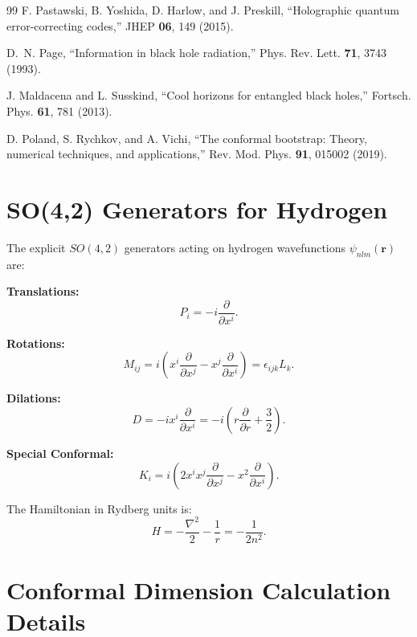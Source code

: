 \documentclass[aps,prd,twocolumn,superscriptaddress,floatfix]{revtex4-2}
\begin{document}
\begin{thebibliography}{99}
F. Pastawski, B. Yoshida, D. Harlow, and J. Preskill,
``Holographic quantum error-correcting codes,''
JHEP \textbf{06}, 149 (2015).

D.~N. Page,
``Information in black hole radiation,''
Phys. Rev. Lett. \textbf{71}, 3743 (1993).

J. Maldacena and L. Susskind,
``Cool horizons for entangled black holes,''
Fortsch. Phys. \textbf{61}, 781 (2013).

D. Poland, S. Rychkov, and A. Vichi,
``The conformal bootstrap: Theory, numerical techniques, and applications,''
Rev. Mod. Phys. \textbf{91}, 015002 (2019).

\end{thebibliography}


\appendix

\section{SO(4,2) Generators for Hydrogen}

The explicit $SO(4,2)$ generators acting on hydrogen wavefunctions $\psi_{nlm}(\mathbf{r})$ are:

\textbf{Translations:}
\begin{equation}
P_i = -i\frac{\partial}{\partial x^i}.
\end{equation}

\textbf{Rotations:}
\begin{equation}
M_{ij} = i\left(x^i \frac{\partial}{\partial x^j} - x^j \frac{\partial}{\partial x^i}\right) = \epsilon_{ijk} L_k.
\end{equation}

\textbf{Dilations:}
\begin{equation}
D = -ix^i \frac{\partial}{\partial x^i} = -i\left(r\frac{\partial}{\partial r} + \frac{3}{2}\right).
\end{equation}

\textbf{Special Conformal:}
\begin{equation}
K_i = i\left(2x^i x^j \frac{\partial}{\partial x^j} - x^2 \frac{\partial}{\partial x^i}\right).
\end{equation}

The Hamiltonian in Rydberg units is:
\begin{equation}
H = -\frac{\nabla^2}{2} - \frac{1}{r} = -\frac{1}{2n^2}.
\end{equation}


\section{Conformal Dimension Calculation Details}
\end{document}
